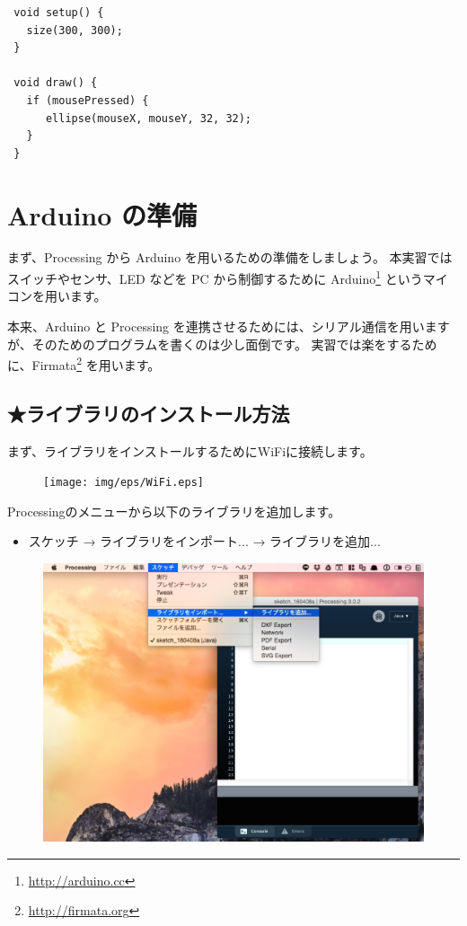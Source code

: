 \documentclass[11pt,a4paper]{jarticle}
\begin{document}
\begin{lstlisting}
 void setup() {
   size(300, 300);
 }

 void draw() {
   if (mousePressed) {
      ellipse(mouseX, mouseY, 32, 32);
   }
 }
\end{lstlisting}



\section{Arduino の準備}
まず、Processing から Arduino を用いるための準備をしましょう。
本実習ではスイッチやセンサ、LED などを PC から制御するために Arduino\footnote{\url{http://arduino.cc}} というマイコンを用います。

本来、Arduino と Processing を連携させるためには、シリアル通信を用いますが、そのためのプログラムを書くのは少し面倒です。
実習では楽をするために、Firmata\footnote{\url{http://firmata.org}} を用います。

\subsection*{★ライブラリのインストール方法}

まず、ライブラリをインストールするためにWiFiに接続します。
\begin{figure}[htbp]
  \centering
  \texttt{[image: img/eps/WiFi.eps]}
\end{figure}

Processingのメニューから以下のライブラリを追加します。
\begin{itemize}
\item スケッチ → ライブラリをインポート... → ライブラリを追加...
\end{itemize}

\begin{figure}[htbp]
  \centering
  \includegraphics[width=0.75\columnwidth]{img/eps/how_to_install_the_Firmata_library1.eps}
  \label{figure:LED}
\end{figure}
\end{document}
